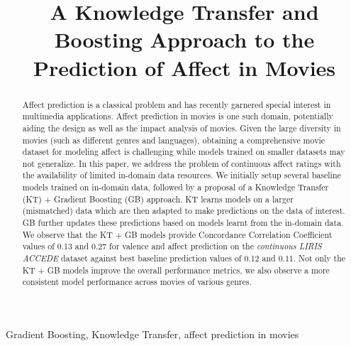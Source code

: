 \documentclass{article}
\title{A Knowledge Transfer and Boosting Approach to the Prediction of Affect in Movies}
\begin{document}
\ninept
%
\maketitle
%

\begin{spacing}{0.9}
\begin{abstract}
Affect prediction is a classical problem and has recently garnered special interest in multimedia applications. 
Affect prediction in movies is one such domain, potentially aiding the design as well as the impact analysis of movies.
Given the large diversity in movies (such as different genres and languages), obtaining a comprehensive movie dataset for modeling affect is challenging while models trained on smaller datasets may not generalize. 
In this paper, we address the problem of continuous affect ratings with the availability of limited in-domain data resources. 
We initially setup several baseline models trained on in-domain data, followed by a proposal of a Knowledge Transfer (KT) + Gradient Boosting (GB) approach.
KT learns models on a larger (mismatched) data which are then adapted to make predictions on the data of interest. 
GB further updates these predictions based on models learnt from the in-domain data.
We observe that the KT + GB models provide Concordance Correlation Coefficient values of 0.13 and 0.27 for valence and affect prediction on the {\it continuous LIRIS ACCEDE} dataset against best baseline prediction values of 0.12 and 0.11. 
Not only the KT + GB models improve the overall performance metrics, we also observe a more consistent model performance across movies of various genres. 
 
\end{abstract}
%
\begin{keywords}
Gradient Boosting, Knowledge Transfer, affect prediction in movies 
\end{keywords}
%
\vspace{-2mm}

\end{spacing}
\end{document}
